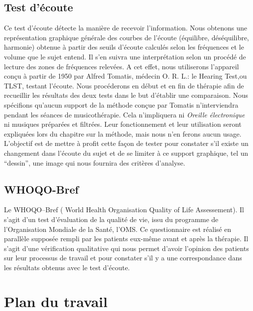         \subsection{Test d'écoute}

        
        Ce test d'écoute détecte la manière de recevoir
        l'information. Nous obtenons une  
	représentation graphique générale des courbes de l'écoute
        (équilibre, déséquilibre, harmonie) obtenue à partir des seuils d'écoute
        calculés selon les fréquences et le volume que le sujet entend. Il s'en suivra une interprétation
        selon un procédé de lecture des zones de fréquences relevées.
	A cet effet, nous utiliserons l'appareil conçu à partir de 1950 par Alfred Tomatis, médecin
        O. R. L.: le Hearing Test,ou TLST, testant
        l'écoute.
	Nous procéderons en début et en fin de thérapie
        afin de recueillir les résultats des
        deux tests dans le but d'établir une comparaison.
        Nous spécifions qu'aucun support de la méthode conçue par
        Tomatis n'interviendra pendant les séances de musicothérapie.
        Cela n'impliquera ni 
\textsl{Oreille
	électronique} ni musiques préparées et filtrées. Leur
      fonctionnement et leur utilisation seront expliquées lors du
      chapitre sur la méthode, mais nous n'en ferons aucun
      usage. L'objectif est de mettre à profit cette façon de  tester pour constater
      s'il existe un changement dans l'écoute du sujet et de
      se limiter à ce support graphique, tel un ``dessin'',
      une image qui nous fournira des critères d'analyse.
       
	
	\subsection{WHOQO-Bref}
        
   Le WHOQO--Bref ( World Health
   Organisation Quality of Life Assessement). Il s'agit d'un test d'évaluation de la qualité de vie, issu du
	programme de l'Organisation Mondiale de la Santé, l'OMS.
	Ce questionnaire est réalisé en parallèle supposée rempli par les patients eux-même  avant et après la thérapie.
	Il s'agit d'une vérification qualitative qui nous permet
        d'avoir l'opinion des patients sur leur processus de travail
        et  pour constater s'il y a une correspondance dans 
        les résultats obtenus avec le test d'écoute. 
	
	
	 
\section{Plan du travail}


